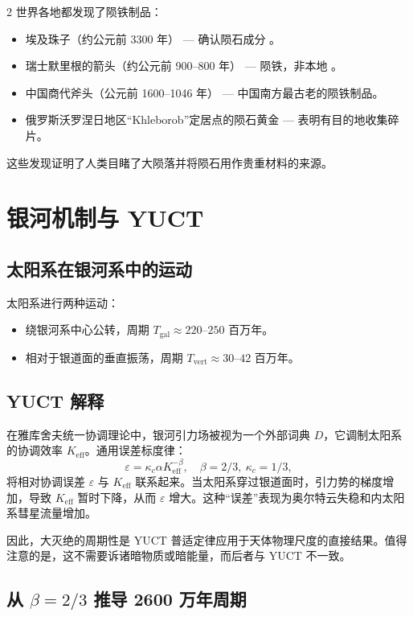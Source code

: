 \documentclass[11pt,a4paper]{article}
\begin{document}
\begin{multicols}{2}
		世界各地都发现了陨铁制品：
		\begin{itemize}
			\item 埃及珠子（约公元前 3300 年） — 确认陨石成分 \cite{Rehren2013}。
			\item 瑞士默里根的箭头（约公元前 900–800 年） — 陨铁，非本地 \cite{Hofmann2023}。
			\item 中国商代斧头（公元前 1600–1046 年） — 中国南方最古老的陨铁制品。
			\item 俄罗斯沃罗涅日地区“Khleborob”定居点的陨石黄金 — 表明有目的地收集碎片。
		\end{itemize}
		这些发现证明了人类目睹了大陨落并将陨石用作贵重材料的来源。
		
		\section{银河机制与 YUCT}
		
		\subsection{太阳系在银河系中的运动}
		
		太阳系进行两种运动：
		\begin{itemize}
			\item 绕银河系中心公转，周期 \(T_{\text{gal}} \approx 220\)–\(250\) 百万年。
			\item 相对于银道面的垂直振荡，周期 \(T_{\text{vert}} \approx 30\)–\(42\) 百万年。
		\end{itemize}
		
		\subsection{YUCT 解释}
		
		在雅库舍夫统一协调理论中，银河引力场被视为一个外部词典 \(D\)，它调制太阳系的协调效率 \(K_{\mathrm{eff}}\)。通用误差标度律：
		\[
		\varepsilon = \kappa_c \alpha K_{\mathrm{eff}}^{-\beta},\quad \beta = 2/3,\ \kappa_c = 1/3,
		\]
		将相对协调误差 \(\varepsilon\) 与 \(K_{\mathrm{eff}}\) 联系起来。当太阳系穿过银道面时，引力势的梯度增加，导致 \(K_{\mathrm{eff}}\) 暂时下降，从而 \(\varepsilon\) 增大。这种“误差”表现为奥尔特云失稳和内太阳系彗星流量增加。
		
		因此，大灭绝的周期性是 YUCT 普适定律应用于天体物理尺度的直接结果。值得注意的是，这不需要诉诸暗物质或暗能量，而后者与 YUCT 不一致。
		
		\subsection{从 \(\beta = 2/3\) 推导 2600 万年周期}
		

\end{multicols}
\end{document}

